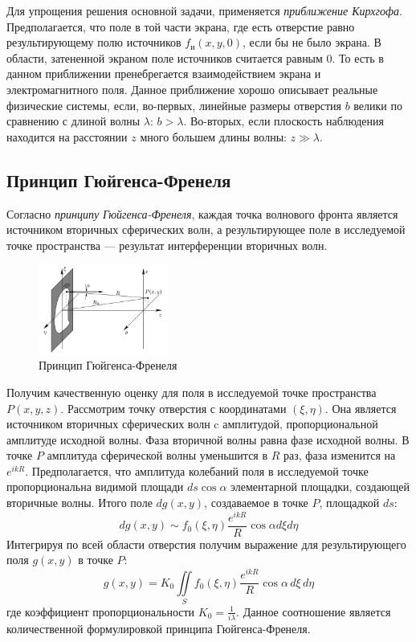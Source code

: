 Для упрощения решения основной задачи, применяется \textit{приближение Кирхгофа}. Предполагается, что поле в той части экрана, где есть отверстие равно результирующему полю источников $f_и(x, y, 0)$, если бы не было экрана. В области, затененной экраном поле источников считается равным 0. То есть в данном приближении пренебрегается взаимодействием экрана и электромагнитного поля. Данное приближение хорошо описывает реальные физические системы, если, во-первых, линейные размеры отверстия $b$ велики по сравнению с длиной волны $\lambda$: $b > \lambda$. Во-вторых, если плоскость наблюдения находится на расстоянии $z$ много большем длины волны: $z \gg \lambda$.

\subsection*{Принцип Гюйгенса-Френеля}

Согласно \textit{принципу Гюйгенса-Френеля}, каждая точка волнового фронта является источником вторичных сферических волн, а результирующее поле в исследуемой точке пространства --- результат интерференции вторичных волн.

\begin{figure}
	\centering
	\includegraphics[width=0.38\textwidth]{../Изображения/Принцип Гюйгенса-Френеля.png}
	\caption{Принцип Гюйгенса-Френеля}
\end{figure}

Получим качественную оценку для поля в исследуемой точке пространства $P(x, y, z)$. Рассмотрим точку отверстия с координатами $(\xi, \eta)$. Она является источником вторичных сферических волн c амплитудой, пропорциональной амплитуде исходной волны. Фаза вторичной волны равна фазе исходной волны. В точке $P$ амплитуда сферической волны уменьшится в $R$ раз, фаза изменится на $e^{ikR}$. Предполагается, что амплитуда колебаний поля в исследуемой точке пропорциональна видимой площади $ds \cos \alpha$ элементарной площадки, создающей вторичные волны. Итого поле $d g(x, y)$, создаваемое в точке $P$, площадкой $ds$:
$$
dg(x, y) \sim f_0(\xi, \eta) \frac{e^{ikR}}{R} \cos \alpha d\xi d\eta
$$
Интегрируя по всей области отверстия получим выражение для результирующего поля $g(x, y)$ в точке $P$:
\begin{equation}
	g(x, y) = K_0 \iint\limits_S f_0(\xi, \eta) \frac{e^{ikR}}{R} \cos \alpha \, d\xi \, d\eta
	\label{theory:Huygens–Fresnel-prec}
\end{equation}
где коэффициент пропорциональности $K_0 = \frac{1}{i \lambda}$. Данное соотношение является количественной формулировкой принципа Гюйгенса-Френеля.

